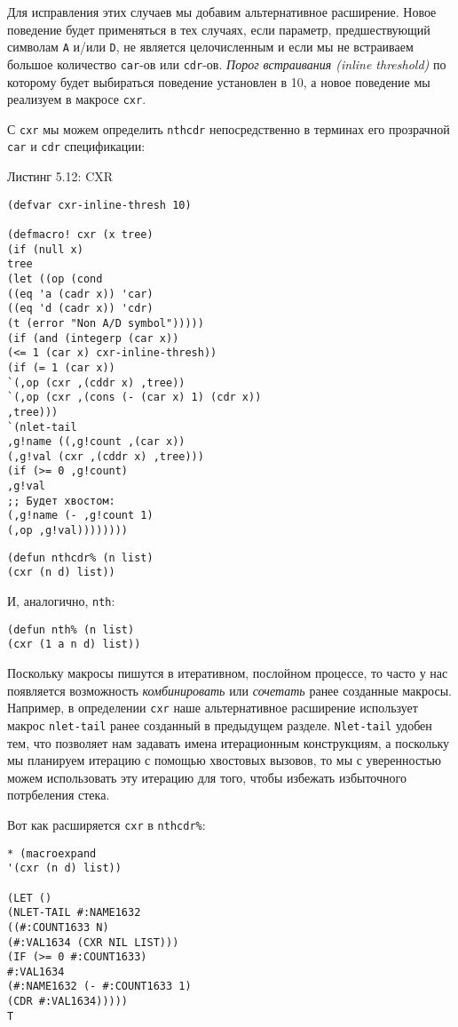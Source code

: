 Для исправления этих случаев мы добавим альтернативное расширение. Новое поведение будет применяться в тех случаях, если параметр, предшествующий символам \verb"A" и/или \verb"D", не является целочисленным и если мы не встраиваем большое количество \verb"car"-ов или \verb"cdr"-ов. \emph{Порог встраивания (inline threshold)} по которому будет выбираться поведение установлен в 10, а новое поведение мы реализуем в макросе \verb"cxr".

С \verb"cxr" мы можем определить \verb"nthcdr" непосредственно в терминах его прозрачной \verb"car" и \verb"cdr" спецификации:

Листинг 5.12: CXR\label{listing_5.12}
\listbegin
\begin{verbatim}
(defvar cxr-inline-thresh 10)

(defmacro! cxr (x tree)
(if (null x)
tree
(let ((op (cond
((eq 'a (cadr x)) 'car)
((eq 'd (cadr x)) 'cdr)
(t (error "Non A/D symbol")))))
(if (and (integerp (car x))
(<= 1 (car x) cxr-inline-thresh))
(if (= 1 (car x))
`(,op (cxr ,(cddr x) ,tree))
`(,op (cxr ,(cons (- (car x) 1) (cdr x))
,tree)))
`(nlet-tail
,g!name ((,g!count ,(car x))
(,g!val (cxr ,(cddr x) ,tree)))
(if (>= 0 ,g!count)
,g!val
;; Будет хвостом:
(,g!name (- ,g!count 1)
(,op ,g!val))))))))
\end{verbatim}
\listend

\begin{verbatim}
(defun nthcdr% (n list)
(cxr (n d) list))
\end{verbatim}

И, аналогично, \verb"nth":

\begin{verbatim}
(defun nth% (n list)
(cxr (1 a n d) list))
\end{verbatim}

Поскольку макросы пишутся в итеративном, послойном процессе, то часто у нас появляется возможность \emph{комбинировать} или \emph{сочетать} ранее созданные макросы. Например, в определении \verb"cxr" наше альтернативное расширение использует макрос \verb"nlet-tail" ранее созданный в предыдущем разделе. \verb"Nlet-tail" удобен тем, что позволяет нам задавать имена итерационным конструкциям, а поскольку мы планируем итерацию с помощью хвостовых вызовов, то мы с уверенностью можем использовать эту итерацию для того, чтобы избежать избыточного потрбеления стека.

Вот как расширяется \verb"cxr" в \verb"nthcdr%":

\begin{verbatim}
* (macroexpand
'(cxr (n d) list))

(LET ()
(NLET-TAIL #:NAME1632
((#:COUNT1633 N)
(#:VAL1634 (CXR NIL LIST)))
(IF (>= 0 #:COUNT1633)
#:VAL1634
(#:NAME1632 (- #:COUNT1633 1)
(CDR #:VAL1634)))))
T
\end{verbatim}


